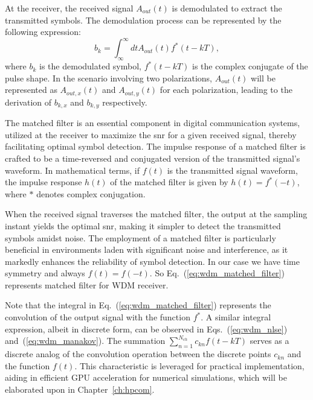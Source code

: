 
At the receiver, the received signal $A_{out}(t)$ is demodulated to extract the transmitted symbols. The demodulation process can be represented by the following expression:
\begin{equation}
b_k = \int^{\infty}_{\infty} dt A_{out}(t) f^{*}(t - kT),
\label{eq:wdm_matched_filter}
\end{equation}
where $b_k$ is the demodulated symbol, $f^{*}(t - kT)$ is the complex conjugate of the pulse shape. In the scenario involving two polarizations, \( A_{out}(t) \) will be represented as \( A_{out,x}(t) \) and \( A_{out,y}(t) \) for each polarization, leading to the derivation of \( b_{k,x} \) and \( b_{k,y} \) respectively.


The matched filter is an essential component in digital communication systems, utilized at the receiver to maximize the \gls{snr} for a given received signal, thereby facilitating optimal symbol detection. The impulse response of a matched filter is crafted to be a time-reversed and conjugated version of the transmitted signal's waveform. In mathematical terms, if \( f(t) \) is the transmitted signal waveform, the impulse response \( h(t) \) of the matched filter is given by \( h(t) = f^*(-t) \), where \( * \) denotes complex conjugation.

When the received signal traverses the matched filter, the output at the sampling instant yields the optimal \Gls{snr}, making it simpler to detect the transmitted symbols amidst noise. The employment of a matched filter is particularly beneficial in environments laden with significant noise and interference, as it markedly enhances the reliability of symbol detection.
In our case we have time symmetry and always $f(t) = f(-t)$. So Eq.~(\ref{eq:wdm_matched_filter}) represents matched filter for WDM receiver.

Note that the integral in Eq.~(\ref{eq:wdm_matched_filter}) represents the convolution of the output signal with the function \(f^{*}\). A similar integral expression, albeit in discrete form, can be observed in Eqs.~(\ref{eq:wdm_nlse}) and~(\ref{eq:wdm_manakov}). The summation \(\sum_{n=1}^{N_{ch}}  c_{kn}   f(t-kT)\) serves as a discrete analog of the convolution operation between the discrete points \(c_{kn}\) and the function \(f(t)\). This characteristic is leveraged for practical implementation, aiding in efficient GPU acceleration for numerical simulations, which will be elaborated upon in Chapter~\ref{ch:hpcom}.

